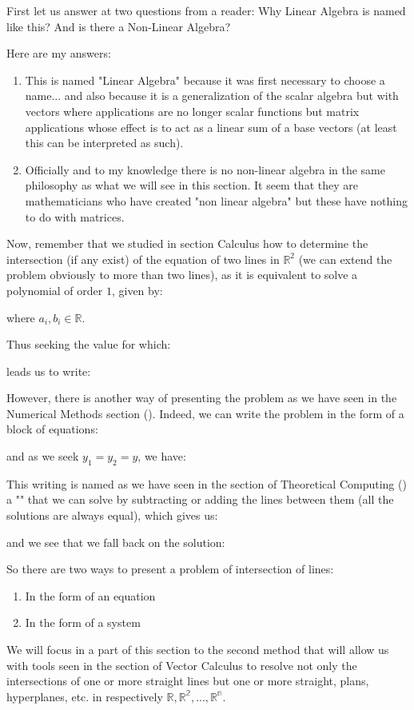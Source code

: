 	First let us answer at  two questions from a reader: Why Linear Algebra is named like this? And is there a Non-Linear Algebra?
	
	Here are my answers:

	\begin{enumerate}
		\item This is named "Linear Algebra" because it was first necessary to choose a name... and also because it is a generalization of the scalar algebra but with vectors where applications are no longer scalar functions but matrix applications whose effect is to act as a linear sum of a base vectors (at least this can be interpreted as such).
		\item Officially and to my knowledge there is no non-linear algebra in the same philosophy as what we will see in this section. It seem that they are mathematicians who have created "non linear algebra" but these have nothing to do with matrices.
	\end{enumerate}

Now, remember that we studied in section Calculus how to determine the intersection (if any exist) of the equation of two lines in $\mathbb{R}^2$  (we can extend the problem obviously to more than two lines), as it is equivalent to solve a polynomial of order $1$, given by:
	
where $a_i,b_i \in \mathbb{R}$.

Thus seeking the value for which:
	
leads us to write:
	
However, there is another way of presenting the problem as we have seen in the Numerical Methods section (). Indeed, we can write the problem in the form of a block of equations:
		
and as we seek $y_1=y_2=y$, we have:
		
This writing is named as we have seen in the section of Theoretical Computing () a "" that we can solve by subtracting or adding the lines between them (all the solutions are always equal), which gives us:
	
and we see that we fall back on the solution:
	
So there are two ways to present a problem of intersection of lines:
	\begin{enumerate}
		\item In the form of an equation
		\item In the form of a system
	\end{enumerate}
We will focus in a part of this section to the second method that will allow us with tools seen in the section of Vector Calculus to resolve not only the intersections of one or more straight lines but one or more straight, plans, hyperplanes, etc. in respectively $\mathbb{R},\mathbb{R^2},...,\mathbb{R^n}$. 

